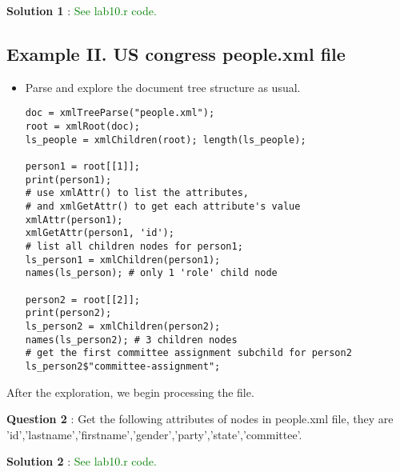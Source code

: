 \documentclass[12pt]{article}
\numberwithin{equation}{subsection}
\begin{document}
\textbf{Solution 1} : \textcolor{green}{See lab10.r code.}

\subsection{Example II. US congress people.xml file}

\begin{itemize}
\item Parse and explore the document tree structure as usual.
\begin{verbatim}
doc = xmlTreeParse("people.xml");
root = xmlRoot(doc); 
ls_people = xmlChildren(root); length(ls_people);

person1 = root[[1]]; 
print(person1);
# use xmlAttr() to list the attributes, 
# and xmlGetAttr() to get each attribute's value
xmlAttr(person1);
xmlGetAttr(person1, 'id');
# list all children nodes for person1;
ls_person1 = xmlChildren(person1);
names(ls_person); # only 1 'role' child node

person2 = root[[2]]; 
print(person2);
ls_person2 = xmlChildren(person2);
names(ls_person2); # 3 children nodes
# get the first committee assignment subchild for person2
ls_person2$"committee-assignment";
\end{verbatim}
\end{itemize}

\noindent
After the exploration, we begin processing the file. \newline

\noindent
\textbf{Question 2} : Get the following attributes of nodes in people.xml file, they are 'id','lastname','firstname','gender','party','state','committee'.\newline

\noindent
\textbf{Solution 2} : \textcolor{green}{See lab10.r code.}
\end{document}
